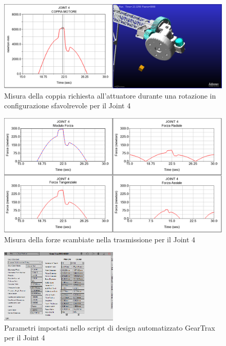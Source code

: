 \documentclass[%
corpo=11pt,
twoside,
 stile=classica,
oldstyle,
greek,%
]{toptesi}
\begin{document}
		
		\begin{figure} [H]
			\centering
			\includegraphics[width=1\textwidth]{Plots/POLSO1/polso1torque.png}
			\caption{Misura della coppia richiesta all'attuatore durante una rotazione in configurazione sfavolrevole per il Joint 4}
			\label{fig:MBDpolso1t}
		\end{figure} 
		\begin{figure} [H]
			\centering
			\includegraphics[width=1\textwidth]{Plots/POLSO1/polso1forces.png}
			\caption{Misura della forze scambiate nella trasmissione per il Joint 4}
			\label{fig:MBDpolso1f}
		\end{figure} 
		\begin{figure} [H]
			\centering
			\includegraphics[width=0.5\textwidth]{Plots/POLSO1/gear_polso1.png}
			\caption{Parametri impostati nello script di design automatizzato GearTrax per il Joint 4}
			\label{fig:Gearpolso1}
		\end{figure} 
	\newpage
\end{document}
